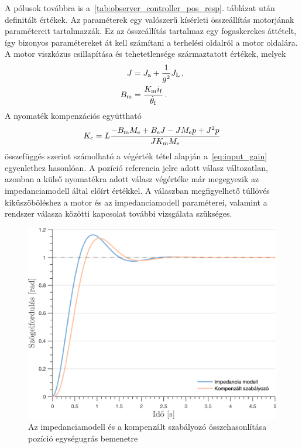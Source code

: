 A pólusok továbbra is a~\ref{tab:observer_controller_pos_resp}. táblázat után definitált értékek. 
Az paraméterek egy valószerű kísérleti összeállítás motorjának paramétereit 
tartalmazzák. Ez az összeállítás tartalmaz egy fogaskerekes áttételt, így bizonyos paramétereket 
át kell számítani a terhelési oldalról a motor oldalára. A motor viszkózus csillapítása és tehetetlensége származtatott értékek, melyek 
\begin{align}
    \begin{split}
        J &= J_{\mathrm{a}} + \frac{1}{g^2}J_{\mathrm{L}}\,, \\
        B_{\mathrm{m}} &= \frac{K_{\mathrm{m}} i_{\mathrm{f}}}{\dot{\theta}_{\mathrm{f}}}\,.
    \end{split}
\end{align}
A nyomaték kompenzációs együttható
\begin{equation}
    K_{\mathrm{c}} = L\frac{- B_{\mathrm{m}} M_{\mathrm{e}} + B_{\mathrm{e}} J - J M_{\mathrm{e}} p + J^2 p}{J K_{\mathrm{m}} M_{\mathrm{e}}}
\end{equation}
összefüggés szerint számolható a végérték tétel alapján a~\eqref{eq:input_gain} egyenlethez hasonlóan.
A pozíció referencia jelre adott válasz változatlan, azonban a külső nyomatékra adott válasz végértéke már
megegyezik az impedanciamodell által előírt értékkel. A válaszban megfigyelhető túllövés kiküszöböléshez
a motor és az impedanciamodell paraméterei, valamint a rendszer válasza közötti kapcsolat további vizsgálata szükséges.

\begin{figure}[ht]
    \begin{center}
    \includegraphics[width=\textwidth]{images/observer_controller_pos_resp_direct_comp.png}
    \caption{Az impedanciamodell és a kompenzált szabályozó összehasonlítása pozíció egységugrás bemenetre}\label{fig:observer_controller_pos_resp_direct}
    \end{center}
\end{figure}

